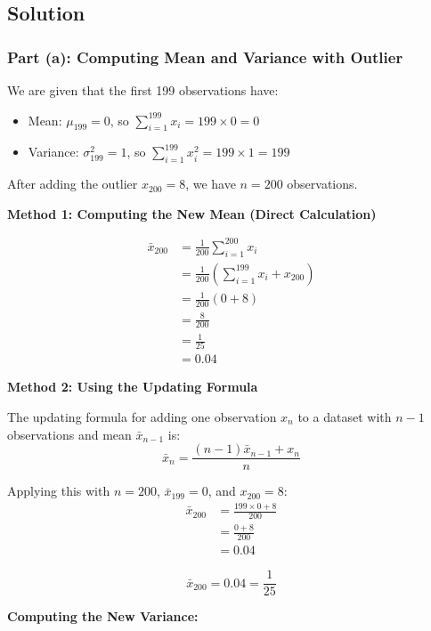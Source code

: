\documentclass[12pt]{article}
\begin{document}
\subsection{Solution}

\subsubsection{Part (a): Computing Mean and Variance with Outlier}

\begin{solution}
We are given that the first 199 observations have:
\begin{itemize}
    \item Mean: \(\mu_{199} = 0\), so \(\sum_{i=1}^{199} x_i = 199 \times 0 = 0\)
    \item Variance: \(\sigma_{199}^2 = 1\), so \(\sum_{i=1}^{199} x_i^2 = 199 \times 1 = 199\)
\end{itemize}

After adding the outlier \(x_{200} = 8\), we have \(n = 200\) observations.

\textbf{Method 1: Computing the New Mean (Direct Calculation)}

\begin{align*}
\bar{x}_{200} &= \frac{1}{200}\sum_{i=1}^{200} x_i \\
&= \frac{1}{200}\left(\sum_{i=1}^{199} x_i + x_{200}\right) \\
&= \frac{1}{200}(0 + 8) \\
&= \frac{8}{200} \\
&= \frac{1}{25} \\
&= 0.04
\end{align*}

\textbf{Method 2: Using the Updating Formula}

The updating formula for adding one observation \(x_n\) to a dataset with \(n-1\) observations and mean \(\bar{x}_{n-1}\) is:
\[
\bar{x}_n = \frac{(n-1)\bar{x}_{n-1} + x_n}{n}
\]

Applying this with \(n = 200\), \(\bar{x}_{199} = 0\), and \(x_{200} = 8\):
\begin{align*}
\bar{x}_{200} &= \frac{199 \times 0 + 8}{200} \\
&= \frac{0 + 8}{200} \\
&= 0.04
\end{align*}

\[
\boxed{\bar{x}_{200} = 0.04 = \frac{1}{25}}
\]

\textbf{Computing the New Variance:}


\end{solution}
\end{document}
